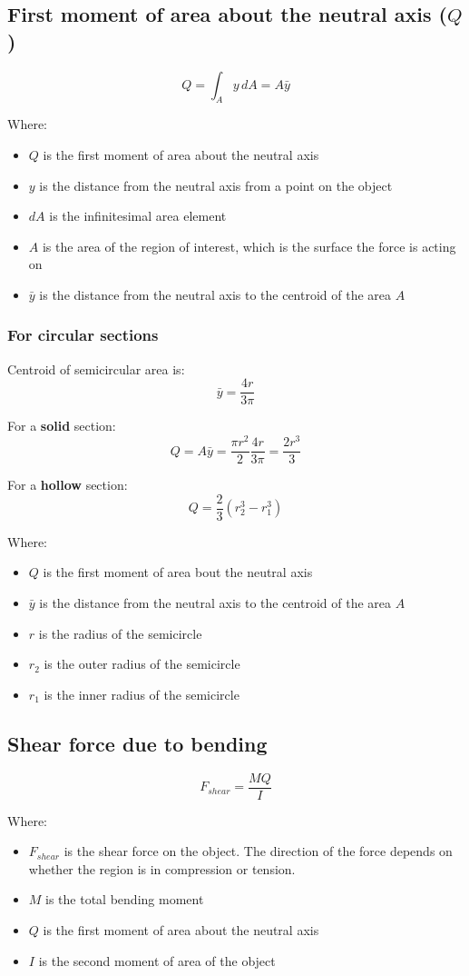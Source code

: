 \documentclass[11pt]{article}
\begin{document}
\subsection{First moment of area about the neutral axis (\(Q\))}
\label{sec:org1170851}
\[Q = \int_{A} y \, dA = A \bar{y}\]

Where:
\begin{itemize}
\item \(Q\) is the first moment of area about the neutral axis
\item \(y\) is the distance from the neutral axis from a point on the object
\item \(dA\) is the infinitesimal area element
\item \(A\) is the area of the region of interest, which is the surface the force is acting on
\item \(\bar{y}\) is the distance from the neutral axis to the centroid of the area \(A\)
\end{itemize}

\subsubsection{For circular sections}
\label{sec:org2efd674}
Centroid of semicircular area is:
\[\bar{y} = \frac{4r}{3 \pi}\]

For a \textbf{solid} section:
\[Q = A \bar{y} = \frac{\pi r^2}{2} \frac{4r}{3 \pi} = \frac{2r^3}{3}\]

For a \textbf{hollow} section:
\[Q = \frac{2}{3} \left(r_2^3 - r_1^3 \right)\]

Where:
\begin{itemize}
\item \(Q\) is the first moment of area bout the neutral axis
\item \(\bar{y}\) is the distance from the neutral axis to the centroid of the area \(A\)
\item \(r\) is the radius of the semicircle
\item \(r_2\) is the outer radius of the semicircle
\item \(r_1\) is the inner radius of the semicircle
\end{itemize}

\subsection{Shear force due to bending}
\label{sec:org1f429c6}
\[F_{shear} = \frac{MQ}{I}\]

Where:
\begin{itemize}
\item \(F_{shear}\) is the shear force on the object. The direction of the force depends on whether the region is in compression or tension.
\item \(M\) is the total bending moment
\item \(Q\) is the first moment of area about the neutral axis
\item \(I\) is the second moment of area of the object
\end{itemize}
\end{document}
